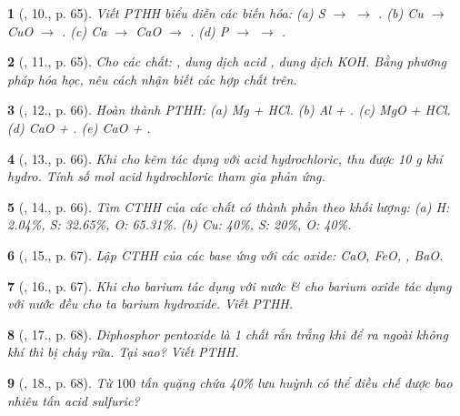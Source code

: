 \documentclass{article}
\newtheorem{baitoan}{}
\begin{document}
\begin{baitoan}[\cite{An_Hoa_Hoc_nang_cao_8_9}, 10., p. 65]
	Viết PTHH biểu diễn các biến hóa: (a) {\rm S $\to$  $\to$ }. (b) {\rm Cu $\to$ CuO $\to$ }. (c) {\rm Ca $\to$ CaO $\to$ }. (d) {\rm P $\to$  $\to$ }.
\end{baitoan}

\begin{baitoan}[\cite{An_Hoa_Hoc_nang_cao_8_9}, 11., p. 65]
	Cho các chất: {\rm{}}, dung dịch acid {\rm{}}, dung dịch {\rm KOH}. Bằng phương pháp hóa học, nêu cách nhận biết các hợp chất trên.
\end{baitoan}

\begin{baitoan}[\cite{An_Hoa_Hoc_nang_cao_8_9}, 12., p. 66]
	Hoàn thành PTHH: (a) {\rm Mg + HCl}. (b) {\rm Al + }. (c) {\rm MgO + HCl}. (d) {\rm CaO + }. (e) {\rm CaO + }.
\end{baitoan}

\begin{baitoan}[\cite{An_Hoa_Hoc_nang_cao_8_9}, 13., p. 66]
	Khi cho kẽm tác dụng với acid hydrochloric, thu được {\rm10 g} khí hydro. Tính số mol acid hydrochloric tham gia phản ứng.
\end{baitoan}

\begin{baitoan}[\cite{An_Hoa_Hoc_nang_cao_8_9}, 14., p. 66]
	Tìm CTHH của các chất có thành phần theo khối lượng: (a) {\rm H: 2.04\%, S: 32.65\%, O: 65.31\%}. (b) {\rm Cu: 40\%, S: 20\%, O: 40\%}.
\end{baitoan}

\begin{baitoan}[\cite{An_Hoa_Hoc_nang_cao_8_9}, 15., p. 67]
	Lập CTHH của các base ứng với các oxide: {\rm CaO, FeO, , BaO}.
\end{baitoan}

\begin{baitoan}[\cite{An_Hoa_Hoc_nang_cao_8_9}, 16., p. 67]
	Khi cho barium tác dụng với nước \& cho barium oxide tác dụng với nước đều cho ta barium hydroxide. Viết PTHH.
\end{baitoan}

\begin{baitoan}[\cite{An_Hoa_Hoc_nang_cao_8_9}, 17., p. 68]
	Diphosphor pentoxide là 1 chất rắn trắng khi để ra ngoài không khí thì bị chảy rữa. Tại sao? Viết PTHH.
\end{baitoan}
\begin{baitoan}[\cite{An_Hoa_Hoc_nang_cao_8_9}, 18., p. 68]
	Từ $100$ tấn quặng chứa {\rm40\%} lưu huỳnh có thể điều chế được bao nhiêu tấn acid sulfuric?
\end{baitoan}
\end{document}
